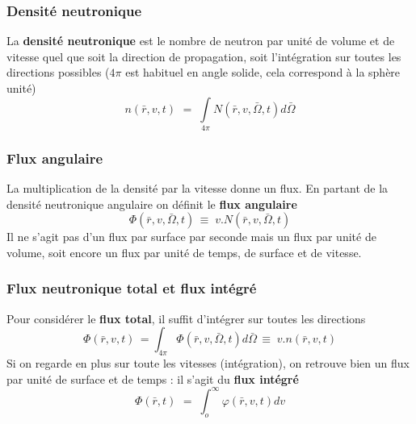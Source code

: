 \subsubsection{Densité neutronique}
La \textbf{densité neutronique} est le nombre de neutron par unité de volume et de vitesse quel 
que soit la direction de propagation, soit l'intégration sur toutes les directions possibles ($4\pi$ 
est habituel en angle solide, cela correspond à la sphère unité)
\begin{equation}
n(\bar r,v,t)\,\, = \;\int\limits_{4\pi }    N(\bar r,v,\bar \Omega ,t)d\bar \Omega 
\end{equation}  

\subsubsection{Flux angulaire}
La multiplication de la densité par la vitesse donne un flux. En partant de la densité neutronique 
angulaire on définit le \textbf{flux angulaire}
\begin{equation}
\varPhi (\bar r,v,\bar \Omega ,t)\, \equiv \;v.N(\bar r,v,\bar \Omega ,t)
\end{equation}
Il ne s'agit pas d'un flux par surface par seconde mais un flux par unité de volume, soit encore un
flux par unité de temps, de surface et de vitesse.

\subsubsection{Flux neutronique total et flux intégré}
Pour considérer le \textbf{flux total}, il suffit d'intégrer sur toutes les directions
\begin{equation}
\varPhi (\bar r,v,t)\, = \int_{4\pi }^{}    \varPhi (\bar r,v,\bar \Omega ,t)d\bar \Omega \, \equiv \;v.n(\bar r,v,t)
\end{equation}
Si on regarde en plus sur toute les vitesses (intégration), on retrouve bien un flux par unité de 
surface et de temps : il s'agit du \textbf{flux intégré}
\begin{equation}
\varPhi (\bar r,t)\,\, = \;\int_o^\infty  \varphi  (\bar r,v,t)dv
\end{equation}

